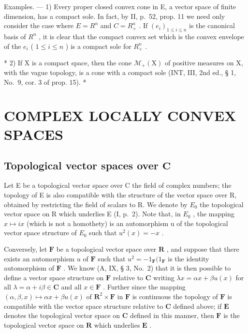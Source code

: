 Examples. --- 1) Every proper closed convex cone in E, a vector space of finite dimension, has a compact sole. In fact, by II, p.~52, prop. 11 we need only consider the case where \(E = R^{n}\) and \(C = R_{+}^{n}\) . If \((e_{i})_{1 \leqslant i \leqslant n}\) is the canonical basis of \(R^{n}\) , it is clear that the compact convex set which is the convex envelope of the \(e_{i}\) ( \(1 \leqslant i \leqslant n\) ) is a compact sole for \(R_{+}^{n}\) .

* 2) If X is a compact space, then the cone \(\mathcal{M}_{+}(\mathrm{X})\) of positive measures on X, with the vague topology, is a cone with a compact sole (INT, III, 2nd ed., § 1, No.~9, cor. 3 of prop. 15). *

\section{COMPLEX LOCALLY CONVEX SPACES}

\subsection{\texorpdfstring{Topological vector spaces over \(\mathbf{C}\)}{Topological vector spaces over the complex field}}

Let E be a topological vector space over C the field of complex numbers; the topology of E is also compatible with the structure of the vector space over R, obtained by restricting the field of scalars to R. We denote by \(E_{0}\) the topological vector space on R which underlies E (I, p.~2). Note that, in \(E_{0}\) , the mapping \(x \mapsto ix\) (which is not a homothety) is an automorphism u of the topological vector space structure of \(E_{0}\) such that \(u^{2}(x) = -x\) .

Conversely, let \(\mathbf{F}\) be a topological vector space over \(\mathbf{R}\) , and suppose that there exists an automorphism \(u\) of \(\mathbf{F}\) such that \(u^2 = -1_{\mathbf{F}}(1_{\mathbf{F}}\) is the identity automorphism of \(\mathbf{F}\) . We know (A, IX, § 3, No.~2) that it is then possible to define a vector space structure on \(\mathbf{F}\) relative to \(\mathbf{C}\) writing \(\lambda x = \alpha x + \beta u(x)\) for all \(\lambda = \alpha + i\beta \in \mathbf{C}\) and all \(x \in \mathbf{F}\) . Further since the mapping \((\alpha, \beta, x) \mapsto \alpha x + \beta u(x)\) of \(\mathbf{R}^2 \times \mathbf{F}\) in \(\mathbf{F}\) is continuous the topology of \(\mathbf{F}\) is compatible with the vector space structure relative to \(\mathbf{C}\) defined above; if \(\mathbf{E}\) denotes the topological vector space on \(\mathbf{C}\) defined in this manner, then \(\mathbf{F}\) is the topological vector space on \(\mathbf{R}\) which underlies \(\mathbf{E}\) .

